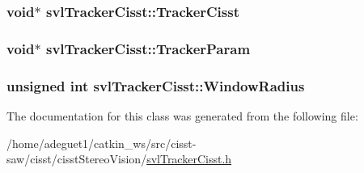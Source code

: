 \hypertarget{classsvl_tracker_cisst_ab5cd9a1b22612f2f1edf6221a5bc5fd9}{
\subsubsection[{Tracker\-Cisst}]{\setlength{\rightskip}{0pt plus 5cm}void$\ast$ svl\-Tracker\-Cisst\-::\-Tracker\-Cisst\hspace{0.3cm}{\ttfamily [protected]}}}\label{classsvl_tracker_cisst_ab5cd9a1b22612f2f1edf6221a5bc5fd9}
\hypertarget{classsvl_tracker_cisst_aba79162c0712eba093998af184933005}{
\subsubsection[{Tracker\-Param}]{\setlength{\rightskip}{0pt plus 5cm}void$\ast$ svl\-Tracker\-Cisst\-::\-Tracker\-Param\hspace{0.3cm}{\ttfamily [protected]}}}\label{classsvl_tracker_cisst_aba79162c0712eba093998af184933005}
\hypertarget{classsvl_tracker_cisst_ab5a2873a52b1514093c0ca59cd4cb51b}{
\subsubsection[{Window\-Radius}]{\setlength{\rightskip}{0pt plus 5cm}unsigned int svl\-Tracker\-Cisst\-::\-Window\-Radius\hspace{0.3cm}{\ttfamily [protected]}}}\label{classsvl_tracker_cisst_ab5a2873a52b1514093c0ca59cd4cb51b}


The documentation for this class was generated from the following file\-:\begin{DoxyCompactItemize}
\item 
/home/adeguet1/catkin\-\_\-ws/src/cisst-\/saw/cisst/cisst\-Stereo\-Vision/\hyperlink{svl_tracker_cisst_8h}{svl\-Tracker\-Cisst.\-h}\end{DoxyCompactItemize}
